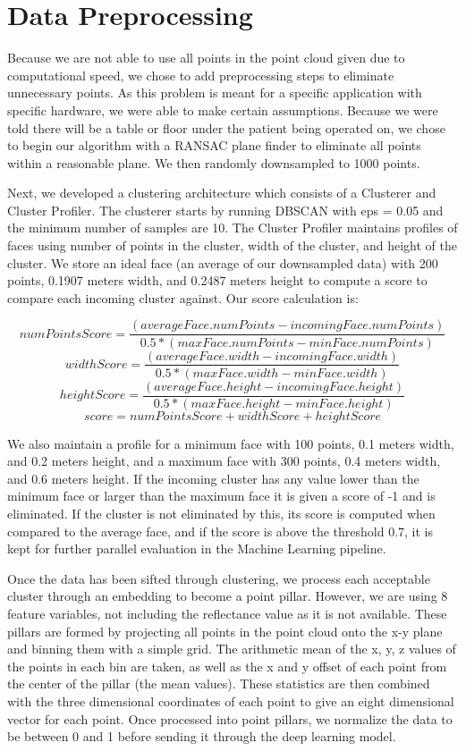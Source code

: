\documentclass{article}
\begin{document}
\section{Data Preprocessing}
Because we are not able to use all points in the point cloud given due to computational speed, we chose to add preprocessing steps to eliminate unnecessary points. As this problem is meant for a specific application with specific hardware, we were able to make certain assumptions. Because we were told there will be a table or floor under the patient being operated on, we chose to begin our algorithm with a RANSAC plane finder to eliminate all points within a reasonable plane. We then randomly downsampled to 1000 points. 

Next, we developed a clustering architecture which consists of a Clusterer and Cluster Profiler. The clusterer starts by running DBSCAN with eps = 0.05 and the minimum number of samples are 10. The Cluster Profiler maintains profiles of faces using number of points in the cluster, width of the cluster, and height of the cluster. We store an ideal face (an average of our downsampled data) with 200 points, 0.1907 meters width, and 0.2487 meters height to compute a score to compare each incoming cluster against. Our score calculation is:

\[
    numPointsScore= \frac{(averageFace.numPoints - incomingFace.numPoints)}{0.5 * (maxFace.numPoints - minFace.numPoints)}
\]
\[
    widthScore= \frac{(averageFace.width - incomingFace.width)}{0.5 * (maxFace.width - minFace.width)}
\]
\[
    heightScore= \frac{(averageFace.height - incomingFace.height)}{0.5 * (maxFace.height - minFace.height)}
\]
\[
    score = numPointsScore + widthScore + heightScore
\]

We also maintain a profile for a minimum face with 100 points, 0.1 meters width, and 0.2 meters height, and a maximum face with 300 points, 0.4 meters width, and 0.6 meters height. If the incoming cluster has any value lower than the minimum face or larger than the maximum face it is given a score of -1 and is eliminated. If the cluster is not eliminated by this, its score is computed when compared to the average face, and if the score is above the threshold 0.7, it is kept for further parallel evaluation in the Machine Learning pipeline. 

Once the data has been sifted through clustering, we process each acceptable cluster through an embedding to become a point pillar\cite{pointpillars}. However, we are using 8 feature variables, not including the reflectance value as it is not available. These pillars are formed by projecting all points in the point cloud onto the x-y plane and binning them with a simple grid. The arithmetic mean of the x, y, z values of the points in each bin are taken, as well as the x and y offset of each point from the center of the pillar (the mean values). These statistics are then combined with the three dimensional coordinates of each point to give an eight dimensional vector for each point. Once processed into point pillars, we normalize the data to be between 0 and 1 before sending it through the deep learning model. 
\end{document}

